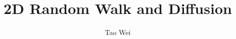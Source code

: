 \documentclass[12pt]{article}
\begin{document}
\title{2D Random Walk and Diffusion}
\author{Tao Wei}
\date{}

\maketitle

\end{document}
